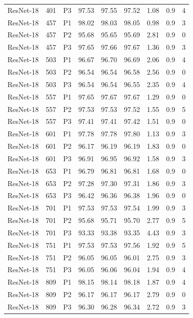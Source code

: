 {\begin{longtable}{lrlrrrrrr}
ResNet-18 & 401 & P3 & 97.53 & 97.55 & 97.52 & 1.08 & 0.9 & 4 \\
ResNet-18 & 457 & P1 & 98.02 & 98.03 & 98.05 & 0.98 & 0.9 & 3 \\
ResNet-18 & 457 & P2 & 95.68 & 95.65 & 95.69 & 2.81 & 0.9 & 0 \\
ResNet-18 & 457 & P3 & 97.65 & 97.66 & 97.67 & 1.36 & 0.9 & 3 \\
ResNet-18 & 503 & P1 & 96.67 & 96.70 & 96.69 & 2.06 & 0.9 & 4 \\
ResNet-18 & 503 & P2 & 96.54 & 96.54 & 96.58 & 2.56 & 0.9 & 0 \\
ResNet-18 & 503 & P3 & 96.54 & 96.54 & 96.55 & 2.35 & 0.9 & 4 \\
ResNet-18 & 557 & P1 & 97.65 & 97.67 & 97.67 & 1.29 & 0.9 & 0 \\
ResNet-18 & 557 & P2 & 97.53 & 97.53 & 97.52 & 1.55 & 0.9 & 5 \\
ResNet-18 & 557 & P3 & 97.41 & 97.41 & 97.42 & 1.51 & 0.9 & 0 \\
ResNet-18 & 601 & P1 & 97.78 & 97.78 & 97.80 & 1.13 & 0.9 & 3 \\
ResNet-18 & 601 & P2 & 96.17 & 96.19 & 96.19 & 1.83 & 0.9 & 0 \\
ResNet-18 & 601 & P3 & 96.91 & 96.95 & 96.92 & 1.58 & 0.9 & 3 \\
ResNet-18 & 653 & P1 & 96.79 & 96.81 & 96.81 & 1.68 & 0.9 & 0 \\
ResNet-18 & 653 & P2 & 97.28 & 97.30 & 97.31 & 1.86 & 0.9 & 3 \\
ResNet-18 & 653 & P3 & 96.42 & 96.36 & 96.38 & 1.96 & 0.9 & 0 \\
ResNet-18 & 701 & P1 & 97.53 & 97.53 & 97.54 & 1.99 & 0.9 & 3 \\
ResNet-18 & 701 & P2 & 95.68 & 95.71 & 95.70 & 2.77 & 0.9 & 5 \\
ResNet-18 & 701 & P3 & 93.33 & 93.38 & 93.35 & 4.43 & 0.9 & 3 \\
ResNet-18 & 751 & P1 & 97.53 & 97.53 & 97.56 & 1.92 & 0.9 & 5 \\
ResNet-18 & 751 & P2 & 96.05 & 96.05 & 96.01 & 2.75 & 0.9 & 3 \\
ResNet-18 & 751 & P3 & 96.05 & 96.06 & 96.04 & 1.94 & 0.9 & 4 \\
ResNet-18 & 809 & P1 & 98.15 & 98.14 & 98.18 & 1.87 & 0.9 & 4 \\
ResNet-18 & 809 & P2 & 96.17 & 96.17 & 96.17 & 2.79 & 0.9 & 0 \\
ResNet-18 & 809 & P3 & 96.30 & 96.28 & 96.34 & 2.72 & 0.9 & 3 \\

\end{longtable}}
